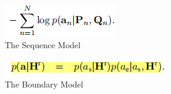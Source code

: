 \documentclass[a4paper,UTF8]{article}
\numberwithin{equation}{section}
\begin{document}
\begin{enumerate}
\begin{figure}[H]
	\end{figure}
	\begin{figure}[H]
		\centering
		\includegraphics[]{3-6.png}
		\caption{The Sequence Model}
	\end{figure}
	\begin{figure}[H]
		\centering
		\includegraphics[]{3-7.png}
		\caption{The Boundary Model}
	\end{figure}
\end{enumerate}

\newpage
\end{document}
